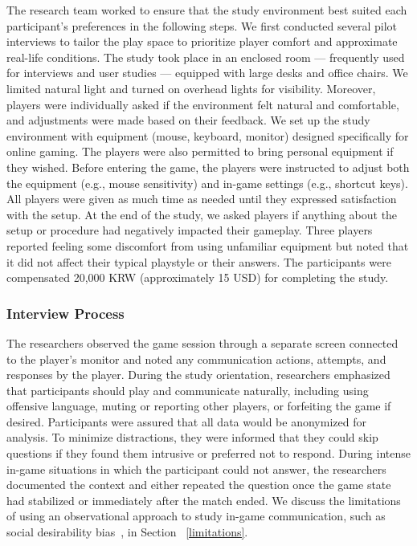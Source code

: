 The research team worked to ensure that the study environment best suited each participant’s preferences in the following steps. We first conducted several pilot interviews to tailor the play space to prioritize player comfort and approximate real-life conditions. The study took place in an enclosed room --- frequently used for interviews and user studies --- equipped with large desks and office chairs. We limited natural light and turned on overhead lights for visibility. Moreover, players were individually asked if the environment felt natural and comfortable, and adjustments were made based on their feedback. We set up the study environment with equipment (mouse, keyboard, monitor) designed specifically for online gaming. The players were also permitted to bring personal equipment if they wished. Before entering the game, the players were instructed to adjust both the equipment (e.g., mouse sensitivity) and in-game settings (e.g., shortcut keys). All players were given as much time as needed until they expressed satisfaction with the setup. At the end of the study, we asked players if anything about the setup or procedure had negatively impacted their gameplay. Three players reported feeling some discomfort from using unfamiliar equipment but noted that it did not affect their typical playstyle or their answers. The participants were compensated 20,000 KRW (approximately 15 USD) for completing the study. 


\subsubsection{Interview Process}

The researchers observed the game session through a separate screen connected to the player's monitor and noted any communication actions, attempts, and responses by the player. During the study orientation, researchers emphasized that participants should play and communicate naturally, including using offensive language, muting or reporting other players, or forfeiting the game if desired. Participants were assured that all data would be anonymized for analysis. To minimize distractions, they were informed that they could skip questions if they found them intrusive or preferred not to respond. During intense in-game situations in which the participant could not answer, the researchers documented the context and either repeated the question once the game state had stabilized or immediately after the match ended. We discuss the limitations of using an observational approach to study in-game communication, such as social desirability bias~\cite{grimm2010social}, in Section ~\ref{limitations}.

